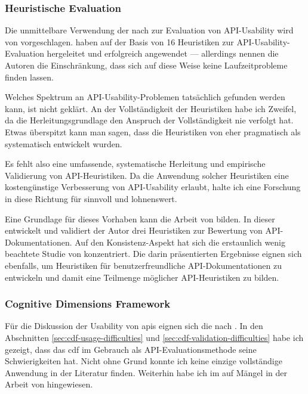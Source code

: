 \subsubsection{Heuristische Evaluation}

Die unmittelbare Verwendung der  nach \cite{Nielsen:1990bw} zur Evaluation von API-Usability wird von \cite{Beaton:2008ix} vorgeschlagen. \cite{Grill:2012jm} haben auf der Basis von \cite{zibran2008makes} 16 Heuristiken zur API-Usability-Evaluation hergeleitet und erfolgreich angewendet --- allerdings nennen die Autoren die Einschränkung, dass sich auf diese Weise keine Laufzeitprobleme finden lassen.

Welches Spektrum an API-Usability-Problemen tatsächlich gefunden werden kann, ist nicht geklärt. An der Vollständigkeit der Heuristiken habe ich Zweifel, da die Herleitungsgrundlage \citep{zibran2008makes} den Anspruch der Vollständigkeit nie verfolgt hat. Etwas überspitzt kann man sagen, dass die Heuristiken von \cite{Grill:2012jm} eher pragmatisch als systematisch entwickelt wurden.

Es fehlt also eine umfassende, systematische Herleitung und empirische Validierung von API-Heuristiken. Da die Anwendung solcher Heuristiken eine kostengünstige Verbesserung von API-Usability erlaubt, halte ich eine Forschung in diese Richtung für sinnvoll und lohnenswert.

Eine Grundlage für dieses Vorhaben kann die Arbeit von \cite{Watson:2012es} bilden. In dieser entwickelt und validiert der Autor drei Heuristiken zur Bewertung von API-Dokumentationen. Auf den Konsistenz-Aspekt hat sich die erstaunlich wenig beachtete Studie von \cite{Correia:2010bx} konzentriert. Die darin präsentierten Ergebnisse eignen sich ebenfalls, um Heuristiken für benutzerfreundliche API-Dokumentationen zu entwickeln und damit eine Teilmenge möglicher API-Heuristiken zu bilden.

\subsubsection{Cognitive Dimensions Framework}
\label{app:cdf}
Für die Diskussion der Usability von \acrshort{api}s eignen sich die  nach \cite{Anonymous:9HSMlhmF}.
In den Abschnitten \ref{sec:cdf-usage-difficulties} und \ref{sec:cdf-validation-difficulties} habe ich gezeigt, dass das \gls{cdf} im Gebrauch als API-Evaluationsmethode seine Schwierigkeiten hat. Nicht ohne Grund konnte ich keine einzige vollständige Anwendung in der Literatur finden. Weiterhin habe ich im  auf Mängel in der Arbeit von \cite{Anonymous:9HSMlhmF} hingewiesen.

